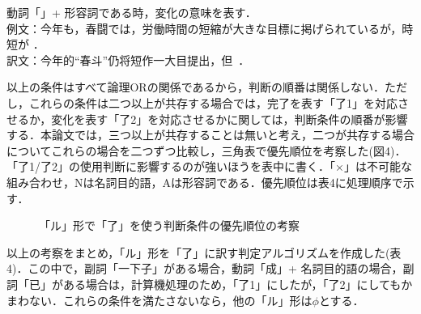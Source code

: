 \begin{enumerater}
\item 動詞「」+ 形容詞である時，変化の意味を表す．\\例文：今年も，春闘では，労働時間の短縮が大きな目標に掲げられているが，時短が ．\\訳文：今年的``春斗''仍将短作一大目提出，但\, ．\\
\end{enumerater}

以上の条件はすべて論理ORの関係であるから，判断の順番は関係しない．ただし，これらの条件は二つ以上が共存する場合では，完了を表す「了1」を対応させるか，変化を表す「了2」を対応させるかに関しては，判断条件の順番が影響する．本論文では，三つ以上が共存することは無いと考え，二つが共存する場合についてこれらの場合を二つずつ比較し，三角表で優先順位を考察した(図4)．「了1/了2」の使用判断に影響するのが強いほうを表中に書く．「×」は不可能な組み合わせ，Nは名詞目的語，Aは形容詞である．優先順位は表4に処理順序で示す．\\

\begin{figure}[hbtp]
\begin{center}
\caption{「ル」形で「了」を使う判断条件の優先順位の考察}
\label{fig:4}
\end{center}
\end{figure}


以上の考察をまとめ，「ル」形を「了」に訳す判定アルゴリズムを作成した(表4)．この中で，副詞「一下子」がある場合，動詞「成」+ 名詞目的語の場合，副詞「已」がある場合は，計算機処理のため，「了1」にしたが，「了2」にしてもかまわない．これらの条件を満たさないなら，他の「ル」形は$\phi$とする．


